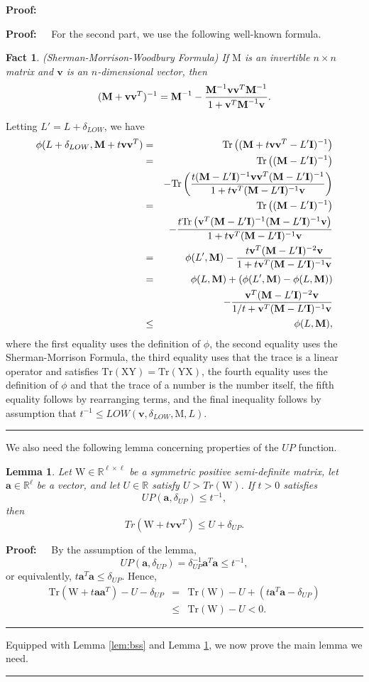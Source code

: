 \documentclass[11pt]{article}
\newcommand{\Trace }[1]{\mbox{}{\mathrm{Tr}}\left(#1\right)}
\newtheorem{lemma}[theorem]{Lemma}
\newenvironment{proof}{\begin{trivlist} \item {\bf Proof:~~}}
  {\qed\end{trivlist}}
\newcommand{\mat}[1]{{\ensuremath{\bm{\mathrm{#1}}}}}
\def\ve{{\mathbf v}}
\def\matI{\mat{I}}
\def\matM{\mat{M}}
\def\matW{\mat{W}}
\def\matX{\mat{X}}
\def\matY{\mat{Y}}
\def\frac#1#2{{#1\over #2}}
\def\qed{\hfill\rule{2mm}{2mm}}
\def\a{{\mathbf a}}
\newtheorem{fact}{Fact}
\begin{document}
\begin{proof}
\begin{proof}
For the second part, we use the following well-known formula.
\begin{fact}(Sherman-Morrison-Woodbury Formula)
If $\matM$ is an invertible $n \times n$ matrix and $\ve$ is an $n$-dimensional vector, then
$$(\matM+\ve\ve^T)^{-1} = \matM^{-1} - \frac{\matM^{-1}\ve\ve^T \matM^{-1}}{1+\ve^T\matM^{-1}\ve}.$$
\end{fact}

Letting $L' = L + \delta_{LOW}$, we have
\begin{eqnarray*}
\phi(L+\delta_{LOW}, \matM + t\ve\ve^T) & = & \Trace{(\matM + t\ve\ve^T - L' \matI)^{-1}}\\
 & = & \Trace{(\matM-L'\matI)^{-1}}\\
&& - \Trace{\frac{t(\matM-L'\matI)^{-1}\ve\ve^T (\matM-L'\matI)^{-1}}{1 + t\ve^T(\matM-L'\matI)^{-1}\ve}}\\
& = & \Trace{(\matM-L'\matI)^{-1}}\\
&& - \frac{t \Trace{\ve^T(\matM-L'\matI)^{-1}(\matM-L'\matI)^{-1}\ve}}{1+t\ve^T(\matM-L'\matI)^{-1}\ve}\\
& = & \phi(L',\matM) - \frac{t\ve^T(\matM-L'\matI)^{-2}\ve}{1+t\ve^T(\matM-L'\matI)^{-1}\ve}\\
& = & \phi(L, \matM) + (\phi(L', \matM) - \phi(L, \matM))\\
&& - \frac{\ve^T(\matM-L'\matI)^{-2}\ve}{1/t + \ve^T(\matM-L'\matI)^{-1}\ve}\\
& \leq & \phi(L,\matM),
\end{eqnarray*}
where the first equality uses the definition of $\phi$, the second equality
uses the Sherman-Morrison Formula, the third equality uses that the trace is a linear operator
and satisfies $\Trace{\matX\matY} = \Trace{\matY\matX}$, 
the fourth equality
uses the definition of $\phi$ and that the trace of a number is the number itself, the fifth
equality follows by rearranging terms, and the final inequality follows by assumption
that $t^{-1} \leq LOW(\ve, \delta_{LOW}, \matM, L)$. 
\end{proof}
We also need the following lemma concerning properties of the $UP$ function.  
\begin{lemma}\label{lem:U}
Let $\matW \in \mathbb{R}^{\ell \times \ell}$ be a symmetric positive semi-definite matrix, let 
$\a \in \mathbb{R}^{\ell}$ be a vector, and let $U \in \mathbb{R}$ satisfy $U > Tr(\matW)$. If $t > 0$ 
satisfies $$UP(\a, \delta_{UP}) \leq t^{-1},$$ 
then
$$Tr(\matW + t\ve\ve^T) \leq U + \delta_{UP}.$$
\end{lemma}
\begin{proof}
By the assumption of the lemma, 
$$UP(\a, \delta_{UP}) = \delta_{UP}^{-1} \a^T \a \leq t^{-1},$$
or equivalently, $t \a^T \a \leq \delta_{UP}$. Hence, 
\begin{eqnarray*}
\Trace{\matW + t\a\a^T} - U - \delta_{UP} & = & \Trace{\matW} - U + (t\a^T\a - \delta_{UP})\\
& \leq & \Trace{\matW} - U < 0.
\end{eqnarray*}
\end{proof}
Equipped with Lemma \ref{lem:bss} and Lemma \ref{lem:U}, we now prove the main lemma we need.


\end{proof}
\end{document}
